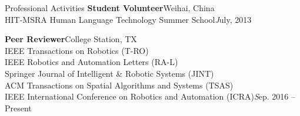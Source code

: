 \documentclass{resume} %
\begin{document}
\begin{rSection}{Professional Activities}
{\bf Student Volunteer}\hfill Weihai, China\\
HIT-MSRA Human Language Technology Summer School\hfill {\emph July, 2013}
\vspace*{-0.2em}

{\bf Peer Reviewer}\hfill College Station, TX\\
IEEE Transactions on Robotics (T-RO)\\
IEEE Robotics and Automation Letters (RA-L)\\
Springer Journal of Intelligent \& Robotic Systems (JINT)\\
ACM Transactions on Spatial Algorithms and Systems (TSAS)\\
IEEE International Conference on Robotics and Automation (ICRA)\hfill {\emph Sep. 2016 -- Present}
\end{rSection}
\end{document}
